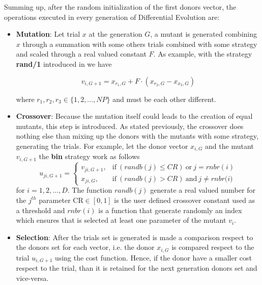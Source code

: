 Summing up, after the random initialization of the first donors vector, the operations executed in every generation of Differential Evolution are:
\begin{itemize}
	\item{\textbf{Mutation}: Let trial $x$ at the generation $G$, a mutant is generated combining $x$ through a summation with some others trials combined with some strategy and scaled through a real valued constant $F$. As example, with the strategy \textbf{rand/1} introduced in \cite{DESEHGOCS:1997} we have
	\begin{center}
		\begin{equation}
			v_{i,G+1} = x_{r_{1},G} + F\cdot(x_{r_{2},G} - x_{x_{3},G})
		\end{equation}
	\end{center}
	where $r_{1},r_{2},r_{3} \in \{1,2,\dots,NP\}$ and must be each other different.
	}
	\item{\textbf{Crossover}: Because the mutation itself could leads to the creation of equal mutants, this step is introduced. As stated previously, the crossover does nothing else than mixing up the donors with the mutants with some strategy, generating the trials. For example, let the donor vector $x_{i,G}$ and the mutant $v_{i,G+1}$ the \textbf{bin} strategy work as follows
	\begin{equation}
		u_{ji, G+1} = \begin{cases}
			v_{ji,G+1}, & \textrm{if}\ (\textit{randb}(j) \leq \textit{CR})\ \textrm{or}\ j=\textit{rnbr}(i)\\
			x_{ji,G}, & \textrm{if}\ (\textit{randb}(j) > \textit{CR})\ \textrm{and}\ j\neq\textit{rnbr(i)}
		\end{cases}
	\end{equation}
	for $i=1,2,\dots,D$. The function $\textit{randb}(j)$ generate a real valued number for the $j^{th}$ parameter $\textrm{CR}\in[0,1]$ is the user defined crossover constant used as a threshold and $\textit{rnbr}(i)$ is a function that generate randomly an index which ensures that is selected at least one parameter of the mutant $v_{i}$.
	}
	\item{\textbf{Selection}: After the trials set is generated is made a comparison respect to the donors set for each vector, i.e. the donor $x_{i, G}$ is compared respect to the trial $u_{i,G+1}$ using the cost function. Hence, if the donor have a smaller cost respect to the trial, than it is retained for the next generation donors set and vice-versa.
	}
\end{itemize}

